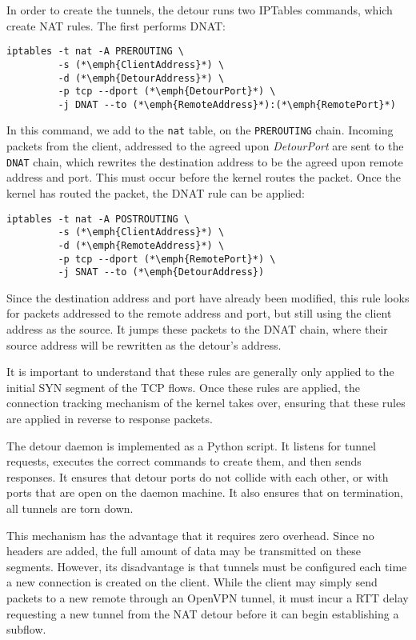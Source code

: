 In order to create the tunnels, the detour runs two IPTables commands, which
create NAT rules. The first performs DNAT:

\begin{lstlisting}
iptables -t nat -A PREROUTING \
         -s (*\emph{ClientAddress}*) \
         -d (*\emph{DetourAddress}*) \
         -p tcp --dport (*\emph{DetourPort}*) \
         -j DNAT --to (*\emph{RemoteAddress}*):(*\emph{RemotePort}*)
\end{lstlisting}

In this command, we add to the \texttt{nat} table, on the \texttt{PREROUTING}
chain. Incoming packets from the client, addressed to the agreed upon
\textit{DetourPort} are sent to the \texttt{DNAT} chain, which rewrites the
destination address to be the agreed upon remote address and port. This must
occur before the kernel routes the packet. Once the kernel has routed the
packet, the DNAT rule can be applied:

\begin{lstlisting}
iptables -t nat -A POSTROUTING \
         -s (*\emph{ClientAddress}*) \
         -d (*\emph{RemoteAddress}*) \
         -p tcp --dport (*\emph{RemotePort}*) \
         -j SNAT --to (*\emph{DetourAddress})
\end{lstlisting}

Since the destination address and port have already been modified, this rule
looks for packets addressed to the remote address and port, but still using the
client address as the source. It jumps these packets to the DNAT chain, where
their source address will be rewritten as the detour's address.

It is important to understand that these rules are generally only applied to the
initial SYN segment of the TCP flows. Once these rules are applied, the
connection tracking mechanism of the kernel takes over, ensuring that these
rules are applied in reverse to response packets.

The detour daemon is implemented as a Python script. It listens for tunnel
requests, executes the correct commands to create them, and then sends
responses. It ensures that detour ports do not collide with each other, or with
ports that are open on the daemon machine. It also ensures that on termination,
all tunnels are torn down.

This mechanism has the advantage that it requires zero overhead. Since no
headers are added, the full amount of data may be transmitted on these segments.
However, its disadvantage is that tunnels must be configured each time a new
connection is created on the client. While the client may simply send packets to
a new remote through an OpenVPN tunnel, it must incur a RTT delay requesting a
new tunnel from the NAT detour before it can begin establishing a subflow.


